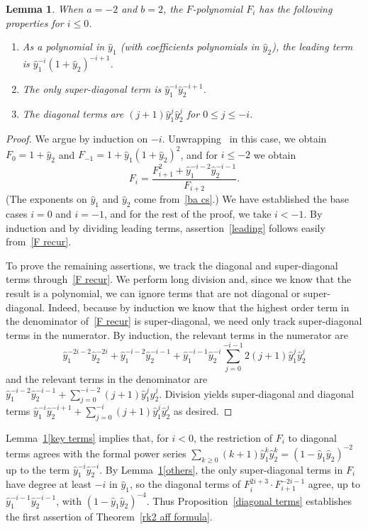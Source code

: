 \documentclass[10pt,a4paper]{amsart}
\newtheorem{lemma}[theorem]{Lemma}
\theoremstyle{definition}
\newcommand{\hy}{\hat{y}}
\begin{document}
\begin{lemma}\label{F coeffs}
When $a=-2$ and $b=2$, the $F$-polynomial $F_i$ has the following properties for $i\le 0$.
\begin{enumerate}[label=(\roman*)]%
\item \label{leading}
As a polynomial in $\hy_1$ (with coefficients polynomials in $\hy_2$), the leading term is $\hy_1^{-i}(1+\hy_2)^{-i+1}$.
\item \label{others}
The only super-diagonal term is $\hy_1^{-i}\hy_2^{-i+1}$.
\item \label{key terms}
The diagonal terms are $(j+1)\hy_1^j\hy_2^j$ for $0\le j\le-i$.
\end{enumerate}
\end{lemma}
\begin{proof}
We argue by induction on $-i$.
Unwrapping~\cite[Proposition~5.1]{ca4} in this case, we obtain $F_0=1+\hy_2$ and $F_{-1}=1+\hy_1(1+\hy_2)^2$, and for $i\le-2$ we obtain
\begin{equation}\label{F recur}
F_i=\frac{F_{i+1}^2+\hy_1^{-i-2}\hy_2^{-i-1}}{F_{i+2}}.
\end{equation}
(The exponents on $\hy_1$ and $\hy_2$ come from~\eqref{ba cs}.)
We have established the base cases $i=0$ and $i=-1$, and for the rest of the proof, we take $i<-1$.
By induction and by dividing leading terms, assertion~\ref{leading} follows easily from~\eqref{F recur}.

To prove the remaining assertions, we track the diagonal and super-diagonal terms through~\eqref{F recur}.
We perform long division and, since we know that the result is a polynomial, we can ignore terms that are not diagonal or super-diagonal.
Indeed, because by induction we know that the highest order term in the denominator of~\eqref{F recur} is super-diagonal, we need only track super-diagonal terms in the numerator.
By induction, the relevant terms in the numerator are 
\[\hy_1^{-2i-2}\hy_2^{-2i}+\hy_1^{-i-2}\hy_2^{-i-1}+\hy_1^{-i-1}\hy_2^{-i}\sum_{j=0}^{-i-1}2(j+1)\hy_1^j\hy_2^j\]
and the relevant terms in the denominator are $\hy_1^{-i-2}\hy_2^{-i-1}+\sum_{j=0}^{-i-2}(j+1)\hy_1^j\hy_2^j$.
Division yields super-diagonal and diagonal terms $\hy_1^{-i}\hy_2^{-i+1}+\sum_{j=0}^{-i}(j+1)\hy_1^j\hy_2^j$ as desired.
\end{proof}

Lemma~\ref{F coeffs}\ref{key terms} implies that, for $i<0$, the restriction of $F_i$ to diagonal terms agrees with the formal power series $\sum_{k\ge0}(k+1)\hy_1^k\hy_2^k=(1-\hy_1\hy_2)^{-2}$ up to the term $\hy_1^{-i}\hy_2^{-i}$.
By Lemma~\ref{F coeffs}\ref{others}, the only super-diagonal terms in $F_i$ have degree at least $-i$ in $\hy_1$, so the diagonal terms of $F_{i}^{2i+3}\cdot F_{i+1}^{-2i-1}$ agree, up to $\hy_1^{-i-1}\hy_2^{-i-1}$, with $(1-\hy_1\hy_2)^{-4}$.
Thus Proposition~\ref{diagonal terms} establishes the first assertion of Theorem~\ref{rk2 aff formula}.
\end{document}
